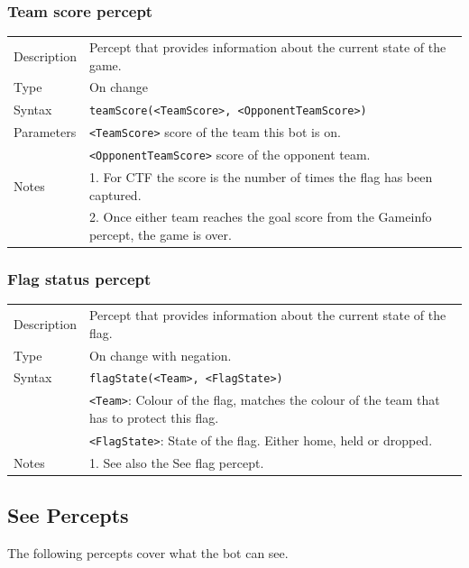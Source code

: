 \documentclass[11pt,a4paper]{article}
\begin{document}
\subsubsection*{Team score percept}
\begin{small}
\begin{tabular}{p{2cm}p{9cm}}
Description & Percept that provides information about the current state of the game.\\
Type & On change\\
Syntax & \verb|teamScore(<TeamScore>, <OpponentTeamScore>)|\\
Parameters &
\verb|<TeamScore>| score of the team this bot is on.\\
& \verb|<OpponentTeamScore>| score of the opponent team.\\
Notes &
	1.	For CTF the score is the number of times the flag has been captured.\\
&	2.	Once either team reaches the goal score from the Gameinfo percept, the game is over. 
\end{tabular}
\end{small}

\subsubsection*{Flag status percept}
\begin{small}
\begin{tabular}{p{2cm}p{9cm}}
Description & Percept that provides information about the current state of the flag.\\
Type & On change with negation.\\
Syntax & \verb|flagState(<Team>, <FlagState>)|\\
& \verb|<Team>|: Colour of the flag, matches the colour of the team that has to protect this flag.\\ 
& \verb|<FlagState>|: State of the flag. Either home, held or dropped.\\
Notes & 
	1.	See also the See flag percept.
\end{tabular}
\end{small}

\subsection{See Percepts}
The following percepts cover what the bot can see. 
\end{document}
